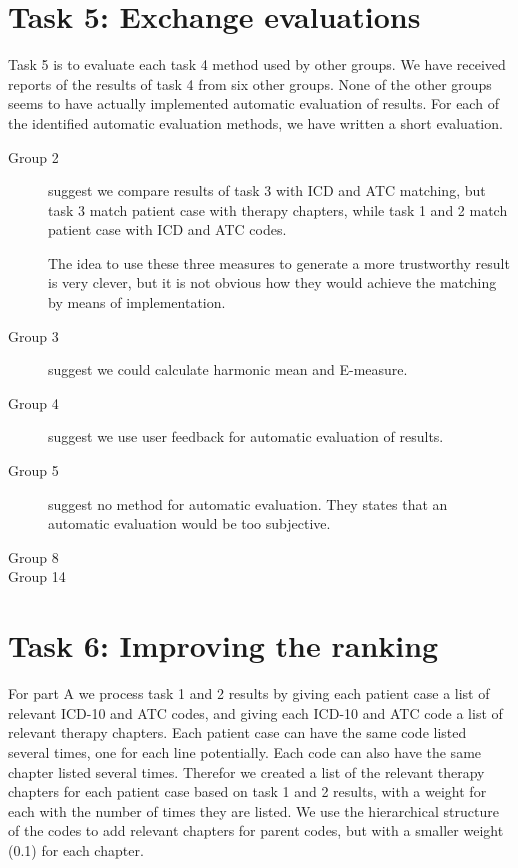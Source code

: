 \section{Task 5: Exchange evaluations}
Task 5 is to evaluate each task 4 method used by other groups.
We have received reports of the results of task 4 from six other groups. 
None of the other groups seems to have actually implemented automatic
evaluation of results. For each of the identified automatic evaluation methods, we have written a short evaluation.

\begin{description}
	\item[Group 2] suggest we compare results of task 3 with ICD and ATC
		matching, but task 3 match patient case with therapy chapters, while
		task 1 and 2 match patient case with ICD and ATC codes. 

The idea to use these three measures to generate a more trustworthy result is very clever, but it is not
		obvious how they would achieve the matching by means of implementation.
	\item[Group 3] suggest we could calculate harmonic mean and E-measure.
	\item[Group 4] suggest we use user feedback for automatic evaluation of
		results.
	\item[Group 5] suggest no method for automatic evaluation. They states that an automatic evaluation would be too subjective.
	\item[Group 8] 
	\item[Group 14]
\end{description}


\section{Task 6: Improving the ranking}
For part A we process task 1 and 2 results by giving each patient case a list
of relevant ICD-10 and ATC codes, and giving each ICD-10 and ATC code a list
of relevant therapy chapters. Each patient case can have the same code listed
several times, one for each line potentially. Each code can also have the same
chapter listed several times. Therefor we created a list of the relevant
therapy chapters for each patient case based on task 1 and 2 results, with a
weight for each with the number of times they are listed. We use the
hierarchical structure of the codes to add relevant chapters for parent codes,
but with a smaller weight (0.1) for each chapter.

